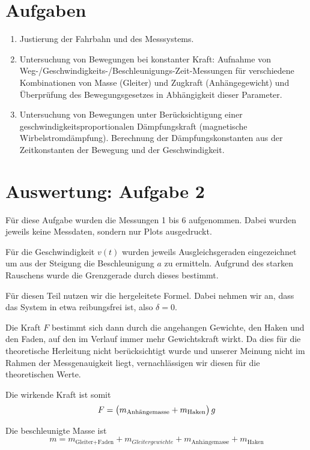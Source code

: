 \documentclass[a4paper,german,12pt,smallheadings]{scrartcl}
\begin{document}
\section*{Aufgaben}
\begin{enumerate}[1.]
  \item
    Justierung der Fahrbahn und des Messsystems.
  \item
    Untersuchung von Bewegungen bei konstanter Kraft: Aufnahme von
    Weg-/Geschwindigkeits-/Beschleunigungs-Zeit-Messungen für verschiedene
    Kombinationen von Masse (Gleiter) und Zugkraft (Anhängegewicht) und
    Überprüfung des Bewegungsgesetzes in Abhängigkeit dieser Parameter.
  \item
    Untersuchung von Bewegungen unter Berücksichtigung einer
    geschwindigkeitsproportionalen Dämpfungskraft (magnetische
    Wirbelstromdämpfung). Berechnung der Dämpfungskonstanten aus der
    Zeitkonstanten der Bewegung und der Geschwindigkeit.
\end{enumerate}

\newpage

\section*{Auswertung: Aufgabe 2}
Für diese Aufgabe wurden die Messungen 1 bis 6 aufgenommen. Dabei wurden
jeweils keine Messdaten, sondern nur Plots ausgedruckt.

Für die Geschwindigkeit $v(t)$ wurden jeweils Ausgleichsgeraden eingezeichnet
um aus der Steigung die Beschleunigung $a$ zu ermitteln. Aufgrund des starken
Rauschens wurde die Grenzgerade durch dieses bestimmt.

Für diesen Teil nutzen wir die hergeleitete Formel. Dabei nehmen wir an, dass
das System in etwa reibungsfrei ist, also $\delta = 0$.

Die Kraft $F$ bestimmt sich dann durch die angehangen Gewichte, den Haken und
den Faden, auf den im Verlauf immer mehr Gewichtskraft wirkt. Da dies für die
theoretische Herleitung nicht berücksichtigt wurde und unserer Meinung nicht im
Rahmen der Messgenauigkeit liegt, vernachlässigen wir diesen für die
theoretischen Werte.

Die wirkende Kraft ist somit
\begin{equation}
  F = \del{m_\text{Anhängemasse} + m_\text{Haken}} g
\end{equation}

Die beschleunigte Masse ist
\begin{equation}
  m = m_\text{Gleiter+Faden} + m_{Gleitergewichte} + m_\text{Anhängemasse} + m_\text{Haken}
\end{equation}
\end{document}
